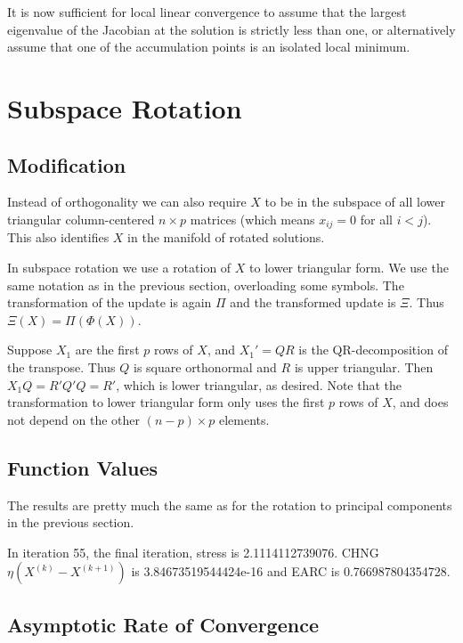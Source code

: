\documentclass[
  12pt,
]{article}
\begin{document}
It is now sufficient for local linear convergence to assume that the largest
eigenvalue of the Jacobian at the solution is strictly
less than one, or alternatively assume that one of the accumulation
points is an isolated local minimum.

\section{Subspace Rotation}\label{subspace-rotation}

\subsection{Modification}\label{modification-1}

Instead of orthogonality we can also require \(X\) to be in the subspace
of all lower triangular column-centered \(n\times p\) matrices (which means \(x_{ij}=0\)
for all \(i<j\)). This also identifies \(X\) in the manifold of rotated solutions.

In subspace rotation we use a rotation of \(X\) to lower triangular form. We use the same
notation as in the previous section, overloading some symbols. The transformation
of the update is again \(\Pi\) and the transformed update is \(\Xi\). Thus \(\Xi(X)=\Pi(\Phi(X))\).

Suppose \(X_1\) are the first \(p\) rows of \(X\), and \(X_1'=QR\) is the QR-decomposition
of the transpose. Thus \(Q\) is square orthonormal and \(R\) is upper triangular.
Then \(X_1Q=R'Q'Q=R'\), which is lower triangular, as desired.
Note that the transformation to lower triangular form only uses the first
\(p\) rows of \(X\), and does not depend on the other \((n - p)\times p\)
elements.

\subsection{Function Values}\label{function-values-2}

The results are pretty much the same as for the rotation to principal components
in the previous section.

In iteration 55, the final iteration, stress is 2.1114112739076. CHNG \(\eta(X^{(k)}-X^{(k+1)})\) is 3.84673519544424e-16 and EARC is 0.766987804354728.

\subsection{Asymptotic Rate of Convergence}\label{asymptotic-rate-of-convergence-2}
\end{document}
